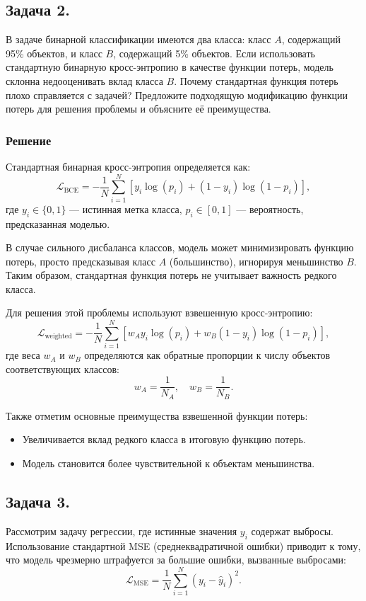 \subsection*{Задача 2.}

В задаче бинарной классификации имеются два класса: класс $A$, содержащий 95\% объектов, и класс $B$, содержащий 5\% объектов. Если использовать стандартную бинарную кросс-энтропию в качестве функции потерь, модель склонна недооценивать вклад класса $B$. Почему стандартная функция потерь плохо справляется с задачей? Предложите подходящую модификацию функции потерь для решения проблемы и объясните её преимущества.

\subsubsection*{Решение}

Стандартная бинарная кросс-энтропия определяется как:
\[
\mathcal{L}_{\text{BCE}} = - \frac{1}{N} \sum_{i=1}^N \left[ y_i \log(p_i) + (1-y_i)\log(1-p_i) \right],
\]
где $y_i \in \{0, 1\}$ — истинная метка класса, $p_i \in [0, 1]$ — вероятность, предсказанная моделью.

В случае сильного дисбаланса классов, модель может минимизировать функцию потерь, просто предсказывая класс $A$ (большинство), игнорируя меньшинство $B$. Таким образом, стандартная функция потерь не учитывает важность редкого класса.

Для решения этой проблемы используют взвешенную кросс-энтропию:
\[
\mathcal{L}_{\text{weighted}} = - \frac{1}{N} \sum_{i=1}^N \left[ w_A y_i \log(p_i) + w_B (1-y_i)\log(1-p_i) \right],
\]
где веса $w_A$ и $w_B$ определяются как обратные пропорции к числу объектов соответствующих классов:
\[
w_A = \frac{1}{N_A}, \quad w_B = \frac{1}{N_B}.
\]

Также отметим основные преимущества взвешенной функции потерь:
\begin{itemize}
    \item Увеличивается вклад редкого класса в итоговую функцию потерь.
    \item Модель становится более чувствительной к объектам меньшинства.
\end{itemize}

\subsection*{Задача 3.}

Рассмотрим задачу регрессии, где истинные значения $y_i$ содержат выбросы. Использование стандартной MSE (среднеквадратичной ошибки) приводит к тому, что модель чрезмерно штрафуется за большие ошибки, вызванные выбросами:
\[
\mathcal{L}_{\text{MSE}} = \frac{1}{N} \sum_{i=1}^N (y_i - \hat{y}_i)^2.
\]

